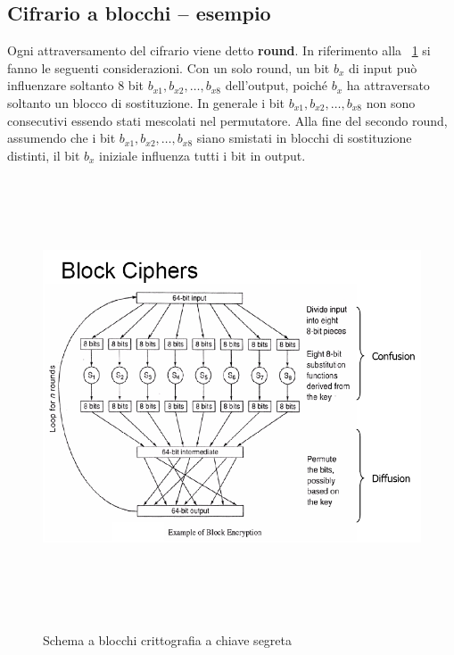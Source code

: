\subsection{Cifrario a blocchi – esempio}
Ogni attraversamento del cifrario viene detto \textbf{round}. In riferimento alla \figurename ~\ref{fig:block_chipher} si fanno le seguenti considerazioni. Con un solo round, un bit $b_x$ di input può influenzare soltanto 8 bit $b_{x1}, b_{x2}, …, b_{x8}$ dell'output, poiché $b_x$ ha attraversato soltanto un blocco di sostituzione. In generale i bit $b_{x1}, b_{x2}, …, b_{x8}$ non sono consecutivi essendo stati mescolati nel permutatore. Alla fine del secondo round, assumendo che i bit $b_{x1}, b_{x2}, …, b_{x8}$ siano smistati in blocchi di sostituzione distinti, il bit $b_x$ iniziale influenza tutti i bit in output.
\begin{figure}[htbp]
	\centering%
	\subfigure%
	{\includegraphics[height=13cm, width=13cm, keepaspectratio]{Immagini/Capitolo2/block_cipher.png}}
	\caption{Schema a blocchi crittografia a chiave segreta \label{fig:block_chipher}} 	
\end{figure}

